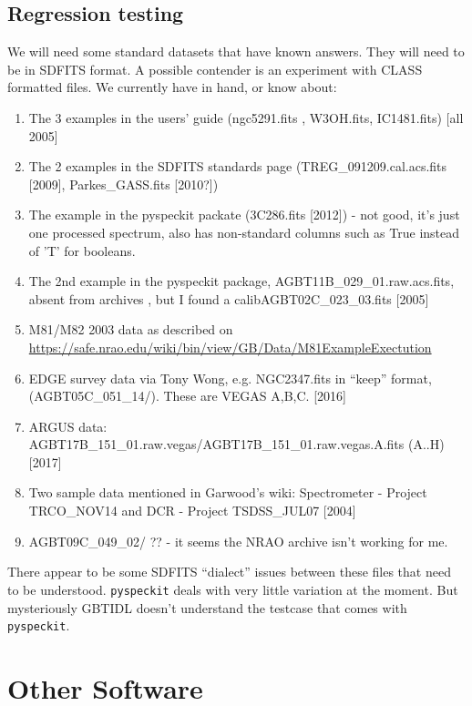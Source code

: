 \documentclass[12pt,a4paper]{article}
\begin{document}
\subsection{Regression testing}

We will need some standard datasets that have known answers. They will need to be in SDFITS format.
A possible contender is an experiment with CLASS formatted files. We currently have in hand,
or know about:

\begin{enumerate}

\item
  The 3 examples in the users' guide (ngc5291.fits , W3OH.fits, IC1481.fits) [all 2005]
\item
  The 2 examples in the SDFITS standards page (TREG\_091209.cal.acs.fits [2009], Parkes\_GASS.fits [2010?])
\item
  The example in the pyspeckit packate (3C286.fits [2012]) - not good, it's just one processed spectrum,
  also has non-standard columns such as True instead of 'T' for booleans.
\item  
  The 2nd example in the pyspeckit package, AGBT11B\_029\_01.raw.acs.fits, absent from archives , but I found a calibAGBT02C\_023\_03.fits [2005]
\item
  M81/M82 2003 data as described on\newline
  \url{https://safe.nrao.edu/wiki/bin/view/GB/Data/M81ExampleExectution}
\item
  EDGE survey data via Tony Wong, e.g. NGC2347.fits in ``keep'' format, (AGBT05C\_051\_14/). These are
  VEGAS A,B,C.   [2016]
\item
  ARGUS data: AGBT17B\_151\_01.raw.vegas/AGBT17B\_151\_01.raw.vegas.A.fits (A..H) [2017]
\item
  Two sample data mentioned in Garwood's wiki: Spectrometer - Project TRCO\_NOV14 and DCR - Project TSDSS\_JUL07 [2004]
\item
  AGBT09C\_049\_02/ ??  - it seems the NRAO archive isn't working for me.
\end{enumerate}

There appear to be some SDFITS ``dialect'' issues between these files that need to be understood.
{\tt pyspeckit} deals with very little variation at the moment. But mysteriously GBTIDL doesn't understand the
testcase that comes with {\tt pyspeckit}.

\section{Other Software}
\end{document}
